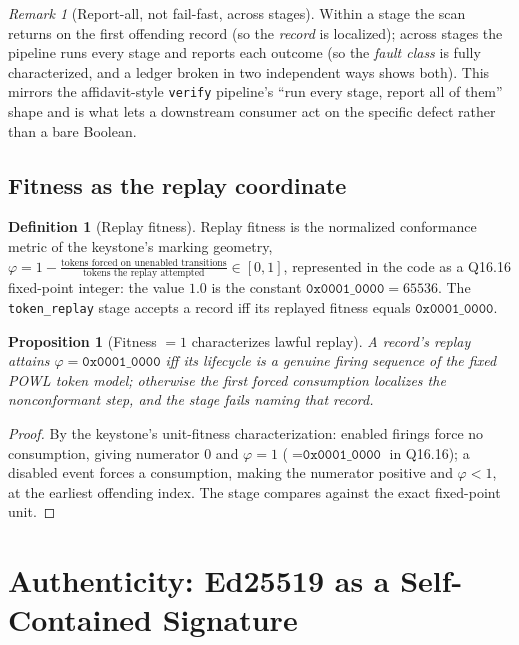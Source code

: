 \documentclass[11pt,oneside]{book}
\theoremstyle{definition}
\newtheorem{definition}{Definition}[chapter]
\theoremstyle{plain}
\newtheorem{proposition}[theorem]{Proposition}
\theoremstyle{remark}
\newtheorem*{remark}{Remark}
\newcommand{\Fitness}{\varphi}
\newcommand{\code}[1]{\texttt{#1}}
\begin{document}
\begin{remark}[Report-all, not fail-fast, across stages]
Within a stage the scan returns on the first offending record (so the \emph{record} is
localized); across stages the pipeline runs every stage and reports each outcome (so the
\emph{fault class} is fully characterized, and a ledger broken in two independent ways shows
both). This mirrors the affidavit-style \code{verify} pipeline's ``run every stage, report all
of them'' shape and is what lets a downstream consumer act on the specific defect rather than
a bare Boolean.
\end{remark}

\section{Fitness as the replay coordinate}
\label{sec:fitness}

\begin{definition}[Replay fitness]\label{def:fitness}
Replay fitness is the normalized conformance metric of the keystone's marking geometry,
$\Fitness=1-\frac{\text{tokens forced on unenabled transitions}}{\text{tokens the replay
attempted}}\in[0,1]$, represented in the code as a Q16.16 fixed-point integer: the value $1.0$
is the constant $\code{0x0001\_0000}=65536$. The \code{token\_replay} stage accepts a record
iff its replayed fitness equals $\code{0x0001\_0000}$.
\end{definition}

\begin{proposition}[Fitness $=1$ characterizes lawful replay]\label{prop:fitness}
A record's replay attains $\Fitness=\code{0x0001\_0000}$ iff its lifecycle is a genuine firing
sequence of the fixed POWL token model; otherwise the first forced consumption localizes the
nonconformant step, and the stage fails naming that record.
\end{proposition}

\begin{proof}
By the keystone's unit-fitness characterization: enabled firings force no consumption, giving
numerator $0$ and $\Fitness=1$ ($=\code{0x0001\_0000}$ in Q16.16); a disabled event forces a
consumption, making the numerator positive and $\Fitness<1$, at the earliest offending index.
The stage compares against the exact fixed-point unit. \end{proof}

\chapter{Authenticity: Ed25519 as a Self-Contained Signature}
\label{ch:auth}
\end{document}
